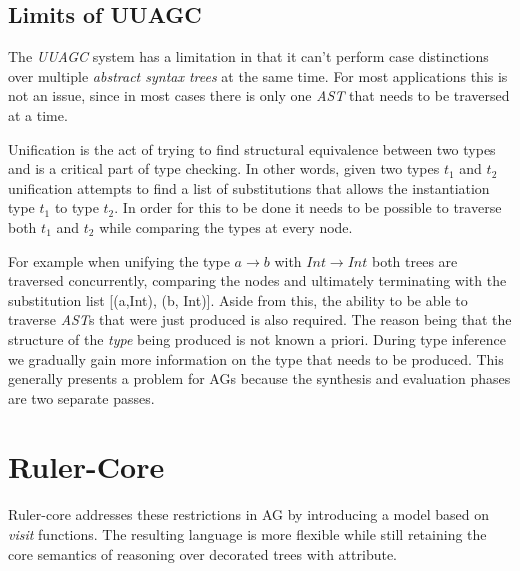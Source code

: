 \subsection{Limits of UUAGC}
The \emph{UUAGC} system has a limitation in that it can't perform case distinctions over multiple \emph{abstract syntax trees} at the same time\cite{visitag}. For most applications this is not an issue, since in most cases there is only one \emph{AST} that needs to be traversed at a time. 

Unification is the act of trying to find structural equivalence between two types and is a critical part of type checking. In other words, given two types \emph{$t_{1}$} and \emph{$t_{2}$} unification attempts to find a list of substitutions that allows the instantiation type \emph{$t_{1}$} to type \emph{$t_{2}$}. In order for this to be done it needs to be possible to traverse both \emph{$t_{1}$} and \emph{$t_{2}$} while comparing the types at every node.

%
%    
%

For example when unifying the type \emph{$a \rightarrow b$} with \emph{$Int \rightarrow Int$} both trees are traversed concurrently, comparing the nodes and ultimately terminating with the substitution list [(a,Int), (b, Int)]. Aside from this, the ability to be able to traverse \emph{AST}s that were just produced is also required. The reason being that the structure of the \emph{type} being produced is not known a priori. During type inference we gradually gain more information on the type that needs to be produced. This generally presents a problem for AGs\cite{ruler-front} because the synthesis and evaluation phases are two separate passes.

\section{Ruler-Core}
Ruler-core addresses these restrictions in AG by introducing a model based on \emph{visit}\cite{visits} functions. The resulting language is more flexible while still retaining the core semantics of reasoning over decorated trees with attribute.

